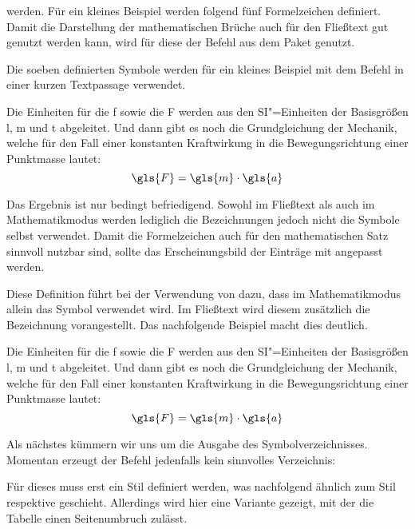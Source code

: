 \documentclass[%
  english,ngerman,%
  cdgeometry=no,DIV=12,automark,%
]{tudscrartcl}
\begin{document}
werden. Für ein kleines Beispiel werden folgend fünf Formelzeichen definiert. 
Damit die Darstellung der mathematischen Brüche auch für den Fließtext gut 
genutzt werden kann, wird für diese der Befehl  aus dem Paket 
 genutzt.
%
\begin{Trunk*}

\end{Trunk*}
%
Die soeben definierten Symbole werden für ein kleines Beispiel mit dem Befehl 
 in einer kurzen Textpassage verwendet.
%
\begin{Hint*}
Die Einheiten für die \gls{f} sowie die \gls{F} werden aus den 
SI"=Einheiten der Basisgrößen \gls{l}, \gls{m} und \gls{t} abgeleitet.
Und dann gibt es noch die Grundgleichung der Mechanik, welche für den
Fall einer konstanten Kraftwirkung in die Bewegungsrichtung einer
Punktmasse lautet:
\[\gls{F} = \gls{m} \cdot \gls{a}\]
\end{Hint*}
%
Das Ergebnis ist nur bedingt befriedigend. Sowohl im Fließtext als auch im 
Mathematikmodus werden lediglich die Bezeichnungen jedoch nicht die Symbole 
selbst verwendet. Damit die Formelzeichen auch für den mathematischen Satz 
sinnvoll nutzbar sind, sollte das Erscheinungsbild der Einträge mit 
 angepasst werden.
%
\begin{Preamble*}
\end{Preamble*}
%
Diese Definition führt bei der Verwendung von  
dazu, dass im Mathematikmodus allein das Symbol verwendet wird. Im Fließtext 
wird diesem zusätzlich die Bezeichnung vorangestellt. Das nachfolgende Beispiel 
macht dies deutlich.
%
\begin{Trunk*}
Die Einheiten für die \gls{f} sowie die \gls{F} werden aus den
SI"=Einheiten der Basisgrößen \gls{l}, \gls{m} und \gls{t} abgeleitet.
Und dann gibt es noch die Grundgleichung der Mechanik, welche für den
Fall einer konstanten Kraftwirkung in die Bewegungsrichtung einer
Punktmasse lautet:
\[\gls{F} = \gls{m} \cdot \gls{a}\]

\end{Trunk*}
%
Als nächstes kümmern wir uns um die Ausgabe des Symbolverzeichnisses. Momentan 
erzeugt der Befehl  jedenfalls kein sinnvolles Verzeichnis:
%
\begin{Hint}
\printsymbols
\end{Hint}
\begin{quoting}[rightmargin=0pt]
\vspace*{-\baselineskipglue}
\glsdisablehyper
\InputCode
\end{quoting}
%
Für dieses muss erst ein Stil definiert werden, was nachfolgend ähnlich zum 
Stil  respektive  geschieht. Allerdings 
wird hier eine Variante gezeigt, mit der die Tabelle einen Seitenumbruch 
zulässt.
\end{document}
